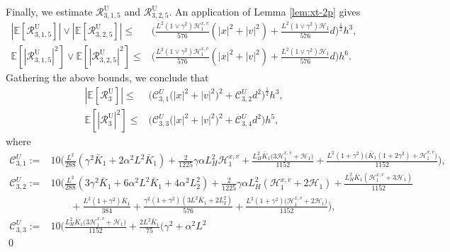 \documentclass[12pt]{article}
\newenvironment{redtext}
  {\color{black}\ignorespaces}
  {\ignorespacesafterend}
\numberwithin{equation}{section}
\renewenvironment{proof}%
  {\begin{trivlist}%
   \item[]\ignorespaces}%
  {\qed\end{trivlist}}
\newcommand{\E}{\mathbb{E}}
\begin{document}
\begin{redtext}
\begin{proof}
Finally, we estimate
$\mathcal R_{3,1,5}^{\mathrm U}$ and
$\mathcal R_{3,2,5}^{\mathrm U}$. An application of Lemma \ref{lem:xt-2p} gives 
\begin{align}
\left|
\E\left[
\mathcal R^{\mathrm U}_{3,1,5}
\right]
\right|
\vee
\left|
\E\left[
\mathcal R^{\mathrm U}_{3,2,5}
\right]
\right|
\leq   &
\Big(
\tfrac{L^2(1\vee\gamma^2)\mathscr H_1^{x,v} }{576}
\left(
|x|^2+|v|^2
\right)
+
\tfrac{L^2(1\vee\gamma^2)\mathscr H_1}{576}d
\Big)^{\frac12}
h^3,
\\  
\E
\left[
\left|
\mathcal R^{\mathrm U}_{3,1,5}
\right|^2
\right]
\vee
\E
\left[
\left|
\mathcal R^{\mathrm U}_{3,2,5}
\right|^2
\right]
\leq   &
\Big(
\tfrac{L^2(1\vee\gamma^2)\mathscr H_1^{x,v} }{576}
\left(
|x|^2+|v|^2
\right)
+
\tfrac{L^2(1\vee\gamma^2)\mathscr H_1}{576}d
\Big)
h^6.
\label{eq:R-U-315-325-weak-bounds}
\end{align}
Gathering the above bounds, we conclude that
\begin{align}\label{eq:R3-weak-strong-error-ubu}
|\E[\mathcal R^{\mathrm{U}}_3]|
\leq  &
\Big(
\mathcal C^{U}_{3,1}
\big(
|x|^2+|v|^2
\big)^2
+
\mathcal C^{U}_{3,2}
d^2
\Big)^{\frac12}
h^3
,
\\ 
\E[|\mathcal R^{\mathrm{U}}_3|^2]
\leq   &
\Big(
\mathcal C^{U}_{3,3}
\big(
|x|^2+|v|^2
\big)^2
+
\mathcal C^{U}_{3,4}
d^2
\Big)
h^5
,
\end{align}
where  
\begin{align}
\label{eq:C3-UBU-constants}
\mathcal C^{U}_{3,1}
:=&
10\Bigg(
\tfrac{L^2}{288}
(
\gamma^2\bar K_1
+
2\alpha^2L^2\bar K_1
)
+
\tfrac{2}{1225}
\gamma\alpha L_H^2
\mathscr H_1^{x,v}
+
\tfrac{L_H^2\bar K_1
\big(
3\mathscr H_1^{x,v}+\mathscr H_1
\big)}{1152}
+
\tfrac{
L^2(1+\gamma^2)
\big(
\bar K_1(1+2\gamma^2)
+
\mathscr H_1^{x,v}
\big)
}{1152}
\Bigg),
\nonumber\\
%
\mathcal C^{U}_{3,2}
:=&
10\Bigg(
\tfrac{L^2}{288}
(
3\gamma^2\bar K_1
+
6\alpha^2L^2\bar K_1
+
4\alpha^2L_2^2
)
+
\tfrac{2}{1225}
\gamma\alpha L_H^2
(
\mathscr H_1^{x,v}
+
2\mathscr H_1
)
+
\tfrac{L_H^2\bar K_1
(
\mathscr H_1^{x,v}
+
3\mathscr H_1
)}{1152}
\nonumber \\
&\qquad +
\tfrac{L^2(1+\gamma^2)\bar K_1}{384}
+
\tfrac{
\gamma^2(1+\gamma^2)
(
3L^2\bar K_1+2L_2^2
)
}{576}
+
\tfrac{
L^2(1+\gamma^2)
\big(
\mathscr H_1^{x,v}
+
2\mathscr H_1
\big)
}{1152}
\Bigg),
\nonumber\\
%
\mathcal C^{U}_{3,3}
:=&
10\Bigg(
\tfrac{L_H^2\bar K_1
\big(
3\mathscr H_1^{x,v}
+
\mathscr H_1
\big)}{1152}
+
\tfrac{2L^2\bar K_1}{75}
\big(
\gamma^2+\alpha^2L^2

\end{align}
\end{proof}
\end{redtext}
\end{document}
